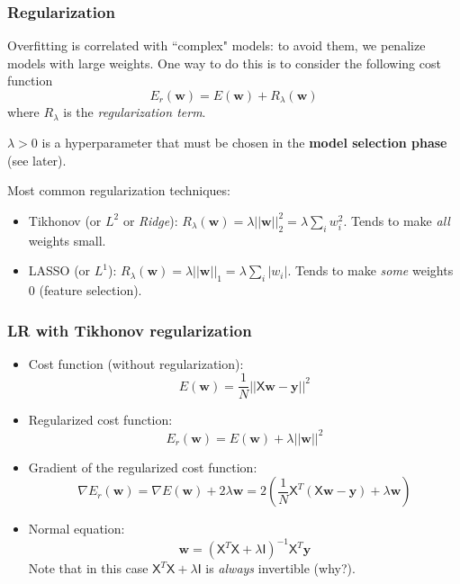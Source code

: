 \documentclass{beamer}
\begin{document}
	
	\begin{frame}
		\frametitle{Regularization}
		
		Overfitting is correlated with ``complex" models: to avoid them, we penalize models with large weights. One way to do this is to consider the following cost function
		\begin{equation*}
			E_{r}(\bm{w}) = E(\bm{w}) + R_{\lambda}(\bm{w})
		\end{equation*}
		where $R_{\lambda}$ is the \textsl{regularization term}.
		
		$\lambda > 0$ is a hyperparameter that must be chosen in the \textbf{model selection phase} (see later).
		
		\vspace{5mm}
		
		Most common regularization techniques:
		\begin{itemize}
			\item Tikhonov (or $L^2$ or \textit{Ridge}): $R_{\lambda}(\bm{w}) = \lambda ||\bm{w}||^2_2 = \lambda \sum_i w_i^2$. Tends to make \textit{all} weights small.
			\item LASSO (or $L^1$): $R_{\lambda}(\bm{w}) = \lambda ||\bm{w}||_1 = \lambda \sum_i |w_i|$. Tends to make \textit{some} weights $0$ (feature selection).
		\end{itemize}
	\end{frame}
	
	\begin{frame}
		\frametitle{LR with Tikhonov regularization}
		\begin{itemize}
			\item Cost function (without regularization):
			\begin{equation*}
				E(\bm{w}) = \frac{1}{N} ||\mathsf{X} \bm{w} - \bm{y}||^2
			\end{equation*}
			\item Regularized cost function:
			\begin{equation*}
				E_{r}(\bm{w}) = E(\bm{w}) + \lambda ||\bm{w}||^2
			\end{equation*}
			\item Gradient of the regularized cost function:
			\begin{equation*}
				\nabla E_r(\bm{w}) = \nabla E(\bm{w}) + 2 \lambda \bm{w} = 2\left(\frac{1}{N}\mathsf{X}^T(\mathsf{X}\bm{w} - \bm{y}) + \lambda \bm{w}\right)
			\end{equation*}
			\item Normal equation:
			\begin{equation*}
				\bm{w} = (\mathsf{X}^T\mathsf{X} + \lambda \mathsf{I})^{-1}\mathsf{X}^T\bm{y}
			\end{equation*}
			Note that in this case $\mathsf{X}^T\mathsf{X} + \lambda \mathsf{I}$ is \textsl{always} invertible (why?).
		\end{itemize}
		
		
	\end{frame}
	
\end{document}

